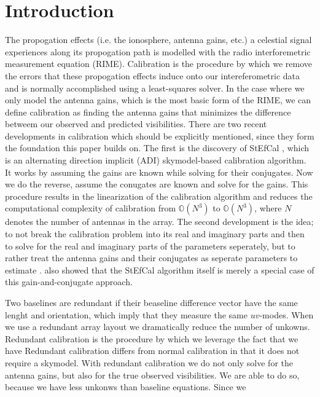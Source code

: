 \documentclass[useAMS,usenatbib]{mn2e}
\begin{document}
\section{Introduction}
The propogation effects (i.e. the ionosphere, antenna gains, etc.) a celestial signal experiences along its propogation path is modelled with the radio interforemetric measurement equation (RIME). %
Calibration is the procedure by which we remove the errors that these propogation effects induce onto our intereferometric data and is normally accomplished using a 
least-squares solver. In the case where we only model the antenna gains, which is the most basic form of the RIME, we can define calibration as finding the antenna gains that minimizes the difference betweem our observed and predicted visibilities. There are two recent developments
in calibration which should be explicitly mentioned, since they form the foundation this paper builds on. The first is the discovery of StEfCal \citep{Salvini2014}, which 
is an alternating direction implicit (ADI) skymodel-based calibration algorithm. It works by assuming the gains are known while solving for their conjugates. Now we do the reverse,
assume the conugates are known and solve for the gains. This procedure results in the linearization of the calibration algorithm and reduces the computational complexity 
of calibration from $\mathbb{O}(N^3)$ to $\mathbb{O}(N^3)$, where $N$ denotes the number of antennas in the array. The second development is the idea; to not break the calibration problem 
into its real and imaginary parts and then to solve for the real and imaginary parts of the parameters seperately, but to rather treat the antenna gains and their 
conjugates as seperate parameters to estimate \citep{Smirnov2015}. \citet{smirnov2015} also showed that the StEfCal algorithm itself is merely a special case of this
gain-and-conjugate approach. 

Two baselines are redundant if their beaseline difference vector have the same lenght and orientation, which imply that they measure the same $uv$-modes. When we use a redundant array layout we dramatically 
reduce the number of unkowns. Redundant calibration is the procedure by which we leverage the fact that we have 
Redundant calibration differs from normal calibration in that it does not require a skymodel. With redundant calibration we do not only solve for the antenna gains, but also 
for the true observed visibilities. We are able to do so, because we have less unkonws than baseline equations. Since we  
\end{document}
